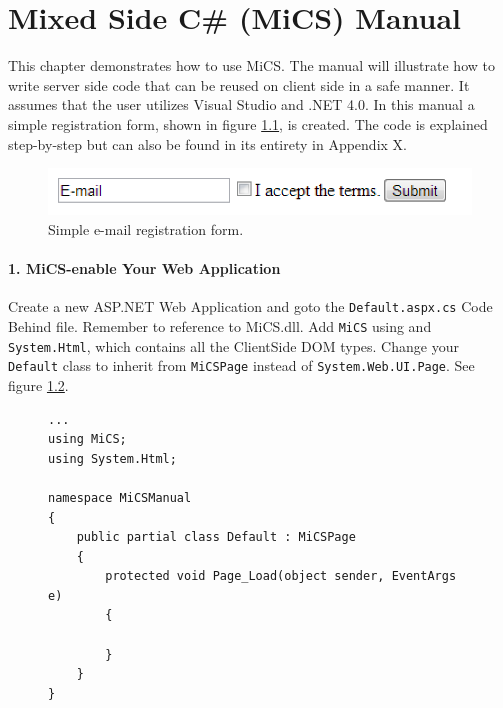\chapter{Mixed Side C\# (MiCS) Manual}
\label{chap:mics_manual}

This chapter demonstrates how to use MiCS. The manual will illustrate how to write server side code that can be reused on client side in a safe manner. It assumes that the user utilizes Visual Studio and .NET 4.0. In this manual a simple registration form, shown in figure \ref{fig:manual_registrationform}, is created. The code is explained step-by-step but can also be found in its entirety in Appendix X.


\begin{figure}[H]
	\begin{center}
		\centerline{\includegraphics[width=12cm]{resources/images/manual_registrationform.png}}
	\end{center}
	\caption{Simple e-mail registration form.}
	\label{fig:manual_registrationform}
\end{figure}


\subsubsection{1. MiCS-enable Your Web Application} %
\label{ssub:mics_enable_your_web_application}
Create a new ASP.NET Web Application and goto the \texttt{Default.aspx.cs} Code Behind file. Remember to reference to MiCS.dll. Add \texttt{MiCS} using and \texttt{System.Html}, which contains all the ClientSide DOM types. Change your \texttt{Default} class to inherit from \texttt{MiCSPage} instead of \texttt{System.Web.UI.Page}. See figure \ref{fig:mics_enable_web_application}.
\begin{figure}[H]
\begin{lstlisting}[language=CSharp,classoffset=1,morekeywords={Default,MiCSPage,Button,CheckBox,TextBox,EventArgs,ClientSide,InputElement,Document,CheckBoxElement,Window,MixedSide,Regex}]
...
using MiCS;
using System.Html;

namespace MiCSManual
{
    public partial class Default : MiCSPage
    {
        protected void Page_Load(object sender, EventArgs e)
        {
   
        }
    }
}
\end{lstlisting}
\caption{}
\label{fig:mics_enable_web_application}
\end{figure}

